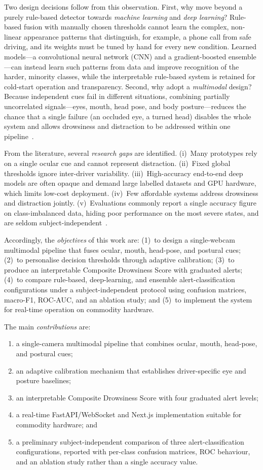 \documentclass[conference]{IEEEtran}
\begin{document}
Two design decisions follow from this observation. First, why move beyond a purely rule-based detector towards \emph{machine learning} and \emph{deep learning}? Rule-based fusion with manually chosen thresholds cannot learn the complex, non-linear appearance patterns that distinguish, for example, a phone call from safe driving, and its weights must be tuned by hand for every new condition. Learned models---a convolutional neural network (CNN) and a gradient-boosted ensemble---can instead learn such patterns from data and improve recognition of the harder, minority classes, while the interpretable rule-based system is retained for cold-start operation and transparency. Second, why adopt a \emph{multimodal} design? Because independent cues fail in different situations, combining partially uncorrelated signals---eyes, mouth, head pose, and body posture---reduces the chance that a single failure (an occluded eye, a turned head) disables the whole system and allows drowsiness and distraction to be addressed within one pipeline~\cite{du,ansari}.

From the literature, several \emph{research gaps} are identified. (i)~Many prototypes rely on a single ocular cue and cannot represent distraction. (ii)~Fixed global thresholds ignore inter-driver variability. (iii)~High-accuracy end-to-end deep models are often opaque and demand large labelled datasets and GPU hardware, which limits low-cost deployment. (iv)~Few affordable systems address drowsiness and distraction jointly. (v)~Evaluations commonly report a single accuracy figure on class-imbalanced data, hiding poor performance on the most severe states, and are seldom subject-independent~\cite{ramzan,ngxande}.

Accordingly, the \emph{objectives} of this work are: (1)~to design a single-webcam multimodal pipeline that fuses ocular, mouth, head-pose, and postural cues; (2)~to personalise decision thresholds through adaptive calibration; (3)~to produce an interpretable Composite Drowsiness Score with graduated alerts; (4)~to compare rule-based, deep-learning, and ensemble alert-classification configurations under a subject-independent protocol using confusion matrices, macro-F1, ROC-AUC, and an ablation study; and (5)~to implement the system for real-time operation on commodity hardware.

The main \emph{contributions} are:
\begin{enumerate}
    \item a single-camera multimodal pipeline that combines ocular, mouth, head-pose, and postural cues;
    \item an adaptive calibration mechanism that establishes driver-specific eye and posture baselines;
    \item an interpretable Composite Drowsiness Score with four graduated alert levels;
    \item a real-time FastAPI/WebSocket and Next.js implementation suitable for commodity hardware; and
    \item a preliminary subject-independent comparison of three alert-classification configurations, reported with per-class confusion matrices, ROC behaviour, and an ablation study rather than a single accuracy value.
\end{enumerate}
\end{document}
